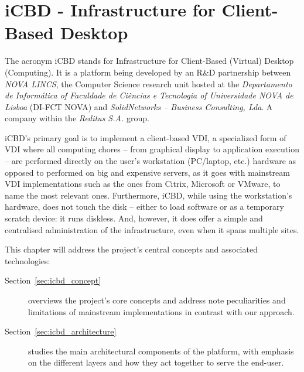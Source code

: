 

\chapter{iCBD - Infrastructure for Client-Based Desktop}
\label{cha:icbd}

The acronym \gls{iCBD} stands for Infrastructure for Client-Based (Virtual) Desktop (Computing). It is a platform being developed by an R\&D partnership between\textit{ NOVA LINCS}, the Computer Science research unit hosted at the \textit{Departamento de Informática of Faculdade de Ciências e Tecnologia of Universidade NOVA de Lisboa} (DI-FCT NOVA) and \textit{SolidNetworks – Business Consulting, Lda}. A company within the \textit{Reditus S.A.} group. 

iCBD’s primary goal is to implement a client-based VDI, a specialized form of \gls{VDI} where all computing chores – from graphical display to application execution – are performed directly on the user’s workstation (PC/laptop, etc.) hardware as opposed to performed on big and expensive servers, as it goes with mainstream VDI implementations such as the ones from Citrix, Microsoft or VMware, to name the most relevant ones. Furthermore, iCBD, while using the workstation’s hardware, does not touch the disk – either to load software or as a temporary scratch device: it runs diskless. And, however, it does offer a simple and centralised administration of the infrastructure, even when it spans multiple sites.

This chapter will address the project’s central concepts and associated technologies:

\begin{description}
	\item [Section~\ref{sec:icbd_concept}] overviews the project’s core concepts and address note peculiarities and limitations of mainstream implementations in contrast with our approach.
	\item [Section~\ref{sec:icbd_architecture}] studies the main architectural components of the platform, with emphasis on the different layers and how they act together to serve the end-user.
\end{description}
\newpage


